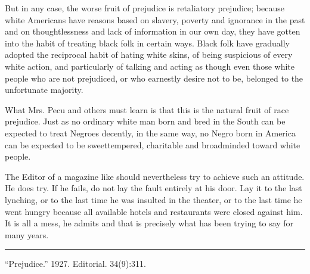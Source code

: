 \documentclass[letterpaper,10pt,english]{jupyterBook}
\begin{document}
\sphinxAtStartPar
But in any case, the worse fruit of prejudice is retaliatory prejudice; because white Americans have reasons based on slavery, poverty and ignorance in the past and on thoughtlessness and lack of information in our own day, they have gotten into the habit of treating black folk in certain ways. Black folk have gradually adopted the reciprocal habit of hating white skins, of being suspicious of every white action, and particularly of talking and acting as though even those white people who are not prejudiced, or who earnestly desire not to be, belonged to the unfortunate majority.

\sphinxAtStartPar
What Mrs. Pecu and others must learn is that this is the natural fruit of race prejudice. Just as no ordinary white man born and bred in the South can be expected to treat Negroes decently, in the same way, no Negro born in America can be expected to be sweet\sphinxhyphen{}tempered, charitable and broadminded toward white people.

\sphinxAtStartPar
The Editor of a magazine like  should nevertheless try to achieve such an attitude. He does try. If he fails, do not lay the fault entirely at his door. Lay it to the last lynching, or to the last time he was insulted in the theater, or to the last time he went hungry because all available hotels and restaurants were closed against him. It is all a mess, he admits and that is precisely what  has been trying to say for many years.


\bigskip\hrule\bigskip


\sphinxAtStartPar
{} “Prejudice.” 1927. Editorial.  34(9):311.
\end{document}
